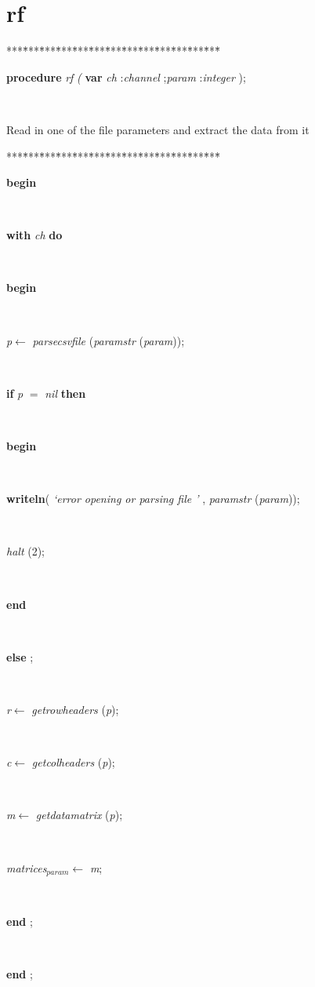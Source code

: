 \documentclass[10pt, a4paper]{article}
\begin{document}
\section{rf}\label{sec:harmonyplanrf}

\begin{tabbing}
***\=***\=***\=***\=***\=***\=***\=***\=***\=***\=***\=***\=***\=\kill
\parbox{14cm}{\textsf{\textbf{procedure}  \textit{rf} \textit{(} \textbf{var}  \textit{ch} :\textit{channel} ;\textit{param} :\textit{integer}  );}}\\
\end{tabbing}
Read in one of the file parameters and extract the data from it
\begin{tabbing}
***\=***\=***\=***\=***\=***\=***\=***\=***\=***\=***\=***\=***\=\kill
\\
\+\parbox{14cm}{\textsf{\textbf{begin} }}\\
\+\parbox{14cm}{\textsf {\textbf {with } \textsf{\textit{ch}} \textbf{ do } }}\\
\<\parbox{14cm}{\textsf{\textbf{begin} }}\\
\parbox{14cm}{\textsf{\textit{p}$\leftarrow$ \textit{parsecsvfile} (\textit{paramstr} (\textit{param}))}; }\\
\+\parbox{14cm}{\textsf {\textbf {if } \textsf{\textit{p} $=$ \textit{nil}} \textbf{ then } }}\\
\<\parbox{14cm}{\textsf{\textbf{begin} }}\\
\parbox{14cm}{\textsf{\textbf{writeln}(\textit{\textrm{\textup { `error opening or parsing file ' } }}, \textit{paramstr} (\textit{param}))}; }\\
\parbox{14cm}{\textsf{\textit{halt} (2)}; }\\
\<\-\parbox{14cm}{\textsf{\textbf{end} }}\\
\parbox{14cm}{\textsf {\textbf {else } \textsf{ ;}}}\\
\parbox{14cm}{\textsf{\textit{r}$\leftarrow$ \textit{getrowheaders} (\textit{p})}; }\\
\parbox{14cm}{\textsf{\textit{c}$\leftarrow$ \textit{getcolheaders} (\textit{p})}; }\\
\parbox{14cm}{\textsf{\textit{m}$\leftarrow$ \textit{getdatamatrix} (\textit{p})}; }\\
\parbox{14cm}{\textsf{\textit{matrices}$_{\textit{param}}$$\leftarrow$ \textit{m}}; }\\
\<\-\parbox{14cm}{\textsf{\textbf{end} ;}}\\
\<\-\parbox{14cm}{\textsf{\textbf{end} ;}}\\
\end{tabbing}
\end{document}
